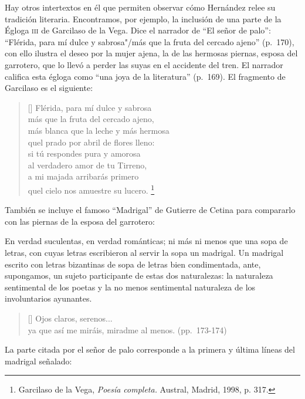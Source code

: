 \documentclass[14pt,twoside,final]{extbook} %
\let\oldfootnote\footnote
\renewcommand\footnote[1]{%
\oldfootnote{\hspace{1mm}#1}}
\begin{document}
Hay otros intertextos en él que permiten observar cómo Hernández relee su tradición literaria. Encontramos, por ejemplo, la inclusión de una parte de la Égloga \textsc{iii} de Garcilaso de la Vega. Dice el narrador de ``El señor de palo'': ``Flérida, para mí dulce y sabrosa"/más que la fruta del cercado ajeno'' (p.~170), con ello ilustra el deseo por la mujer ajena, la de las hermosas piernas, esposa del garrotero, que lo llevó a perder las suyas en el accidente del tren. El narrador califica esta égloga como ``una joya de la literatura'' (p.~169). El fragmento de Garcilaso es el siguiente:
\settowidth{\versewidth}{más blanca que la leche y más hermosa}
\begin{verse}[\versewidth]
Flérida, para mí dulce y sabrosa \\
más que la fruta del cercado ajeno, \\
más blanca que la leche y más hermosa \\
qu\textquotesingle{}el prado por abril de flores lleno: \\
si tú respondes pura y amorosa \\
al verdadero amor de tu Tirreno, \\
a mi majada arribarás primero \\
qu\textquotesingle{}el cielo nos amuestre su lucero.\footnote{Garcilaso de la Vega, \emph{Poesía completa.} Austral, Madrid, 1998, p. 317.}
\end{verse}
También se incluye el famoso ``Madrigal'' de Gutierre de Cetina para compararlo con las piernas de la esposa del garrotero:
\begin{quoting}
En verdad suculentas, en verdad románticas; ni más ni menos que una sopa de letras, con cuyas letras escribieron al servir la sopa un madrigal. Un madrigal escrito con letras bizantinas
de sopa de letras bien condimentada, ante, supongamos, un sujeto participante de estas dos naturalezas: la naturaleza sentimental de los poetas y la no menos sentimental naturaleza de los involuntarios ayunantes.
\begin{verse}[\versewidth]
Ojos claros, serenos... \\
ya que así me miráis, miradme al menos. (pp.~\mbox{173-174})
\end{verse}
\end{quoting}
La parte citada por el señor de palo corresponde a la primera y última líneas del madrigal señalado:
\settowidth{\versewidth}{ya que así me miráis, miradme al menos.}
\end{document}

